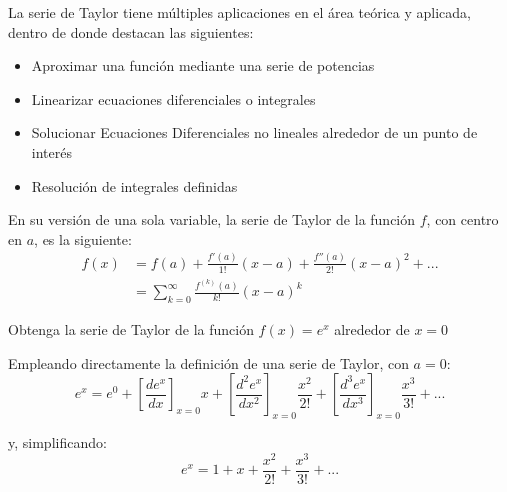 La serie de Taylor tiene múltiples aplicaciones en el área teórica y
aplicada, dentro de donde destacan las siguientes:

\begin{itemize}
    \item
        Aproximar una función mediante una serie de potencias
    \item
        Linearizar ecuaciones diferenciales o integrales
    \item
        Solucionar Ecuaciones Diferenciales no lineales alrededor de un punto
        de interés
    \item
        Resolución de integrales definidas
\end{itemize}

\begin{definition}

    En su versión de una sola variable, la serie de Taylor de la función $f$,
    con centro en $a$, es la siguiente:
    \begin{align*}
        f(x) &= f(a) + \frac{f'(a)}{1!}(x - a) + \frac{f''(a)}{2!}(x - a)^2 + ... \\
             &= \sum_{k = 0}^{\infty} \frac{f^{(k)}(a)}{k!}(x - a)^k
    \end{align*}

\end{definition}


\begin{ex}
    Obtenga la serie de Taylor de la función \(f(x) = e^x\) alrededor de \(x = 0\)
    \begin{solution}

        Empleando directamente la definición de una serie de Taylor, con \(a = 0\):
        \[
            e^x = e^0 + \left[\frac{de^x}{dx}\right]_{x = 0} x + \left[\frac{d^2e^x}{dx^2}\right]_{x = 0} \frac{x^2}{2!} + \left[\frac{d^3e^x}{dx^3}\right]_{x = 0} \frac{x^3}{3!} + ...
        \]

        \noindent y, simplificando:
        \[
            \boxed{e^x = 1 + x + \frac{x^2}{2!} + \frac{x^3}{3!} + ...}
        \]

    \end{solution}
\end{ex}


